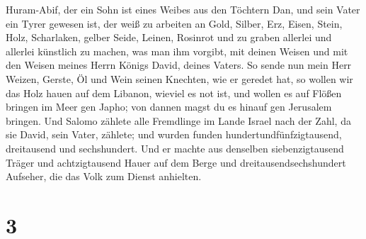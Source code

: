 Huram-Abif,  der ein Sohn ist eines Weibes aus den Töchtern
Dan, und sein Vater ein Tyrer gewesen ist, der weiß zu arbeiten an Gold,
Silber, Erz, Eisen, Stein, Holz, Scharlaken, gelber Seide, Leinen,
Rosinrot und zu graben allerlei und allerlei künstlich zu machen, was
man ihm vorgibt, mit deinen Weisen und mit den Weisen meines Herrn
Königs David, deines Vaters.  So sende nun mein Herr
Weizen, Gerste, Öl und Wein seinen Knechten, wie er geredet hat,
 so wollen wir das Holz hauen auf dem Libanon, wieviel es
not ist, und wollen es auf Flößen bringen im Meer gen Japho; von dannen
magst du es hinauf gen Jerusalem bringen.  Und Salomo
zählete alle Fremdlinge im Lande Israel nach der Zahl, da sie David,
sein Vater, zählete; und wurden funden hundertundfünfzigtausend,
dreitausend und sechshundert.  Und er machte aus denselben
siebenzigtausend Träger und achtzigtausend Hauer auf dem Berge und
dreitausendsechshundert Aufseher, die das Volk zum Dienst anhielten.

\hypertarget{section-2}{%
\section{3}\label{section-2}}

